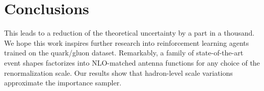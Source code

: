 \section{Conclusions}\label{sec:conclusions}

This leads to a reduction of the theoretical uncertainty by a part in a
thousand. We hope this work inspires further research into reinforcement
learning agents trained on the quark/gluon dataset. Remarkably, a family
of state-of-the-art event shapes factorizes into NLO-matched antenna
functions for any choice of the renormalization scale. Our results show
that hadron-level scale variations approximate the importance sampler.

